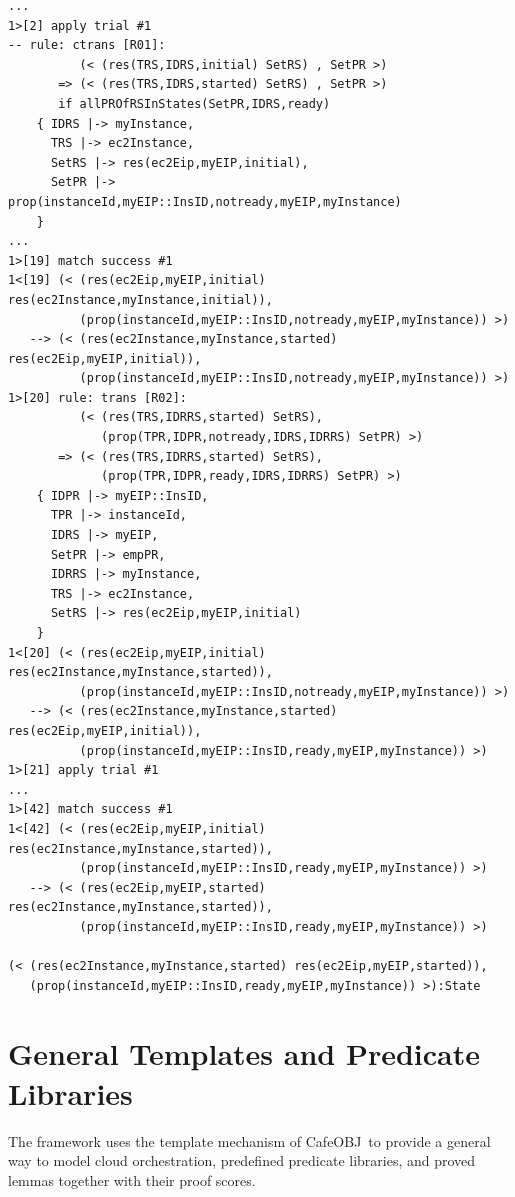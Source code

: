 \documentclass[12pt]{report}
\newcommand{\cafeobj}{{\sf CafeOBJ}~}
\begin{document}
\begin{verbatim}
...
1>[2] apply trial #1
-- rule: ctrans [R01]: 
          (< (res(TRS,IDRS,initial) SetRS) , SetPR >) 
       => (< (res(TRS,IDRS,started) SetRS) , SetPR >)
       if allPROfRSInStates(SetPR,IDRS,ready)
    { IDRS |-> myInstance, 
      TRS |-> ec2Instance, 
      SetRS |-> res(ec2Eip,myEIP,initial), 
      SetPR |-> prop(instanceId,myEIP::InsID,notready,myEIP,myInstance)
    }
...
1>[19] match success #1
1<[19] (< (res(ec2Eip,myEIP,initial) res(ec2Instance,myInstance,initial)),
          (prop(instanceId,myEIP::InsID,notready,myEIP,myInstance)) >)
   --> (< (res(ec2Instance,myInstance,started) res(ec2Eip,myEIP,initial)),
          (prop(instanceId,myEIP::InsID,notready,myEIP,myInstance)) >)
1>[20] rule: trans [R02]:
          (< (res(TRS,IDRRS,started) SetRS),
             (prop(TPR,IDPR,notready,IDRS,IDRRS) SetPR) >)
       => (< (res(TRS,IDRRS,started) SetRS),
             (prop(TPR,IDPR,ready,IDRS,IDRRS) SetPR) >)
    { IDPR |-> myEIP::InsID,
      TPR |-> instanceId,
      IDRS |-> myEIP,
      SetPR |-> empPR,
      IDRRS |-> myInstance,
      TRS |-> ec2Instance,
      SetRS |-> res(ec2Eip,myEIP,initial)
    }
1<[20] (< (res(ec2Eip,myEIP,initial) res(ec2Instance,myInstance,started)),
          (prop(instanceId,myEIP::InsID,notready,myEIP,myInstance)) >)
   --> (< (res(ec2Instance,myInstance,started) res(ec2Eip,myEIP,initial)),
          (prop(instanceId,myEIP::InsID,ready,myEIP,myInstance)) >)
1>[21] apply trial #1
...
1>[42] match success #1
1<[42] (< (res(ec2Eip,myEIP,initial) res(ec2Instance,myInstance,started)),
          (prop(instanceId,myEIP::InsID,ready,myEIP,myInstance)) >)
   --> (< (res(ec2Eip,myEIP,started) res(ec2Instance,myInstance,started)),
          (prop(instanceId,myEIP::InsID,ready,myEIP,myInstance)) >)

(< (res(ec2Instance,myInstance,started) res(ec2Eip,myEIP,started)),
   (prop(instanceId,myEIP::InsID,ready,myEIP,myInstance)) >):State
\end{verbatim}
\normalsize

\chapter{General Templates and Predicate Libraries}
\label{chap:reusable}
The framework uses the template mechanism of \cafeobj to provide a
general way to model cloud orchestration, predefined predicate
libraries, and proved lemmas together with their proof scores.
\end{document}
